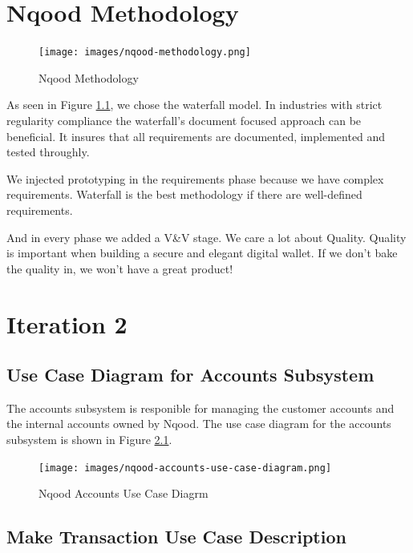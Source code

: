 \documentclass[a4paper]{report}
\begin{document}
\chapter{Nqood Methodology}

\begin{figure}[h!]
    \centering
    \texttt{[image: images/nqood-methodology.png]}
    \caption{Nqood Methodology}
    \label{fig:nqood-methodology}
\end{figure}

As seen in Figure \ref{fig:nqood-methodology}, we chose the waterfall model. In industries with strict regularity compliance the waterfall's
document focused approach can be beneficial. It insures that all requirements are documented, implemented and tested
throughly.

We injected prototyping in the requirements phase because we have complex requirements. Waterfall is the best methodology if there are well-defined requirements.

And in every phase we added a V\&V stage. We care a lot about Quality. Quality is important when building a secure and elegant digital wallet. If we don't bake the quality in, we won't have a great product!

\chapter{Iteration 2}

\section{Use Case Diagram for Accounts Subsystem}

The accounts subsystem is responible for managing the customer accounts and the internal accounts owned by Nqood. The use case diagram for the accounts subsystem is shown in Figure \ref{fig:nqood-accounts-use-case-diagram}.

\begin{figure}[h!]
    \centering
    \texttt{[image: images/nqood-accounts-use-case-diagram.png]}
    \caption{Nqood Accounts Use Case Diagrm}
    \label{fig:nqood-accounts-use-case-diagram}
\end{figure}

\newpage

\section{Make Transaction Use Case Description}
\end{document}
